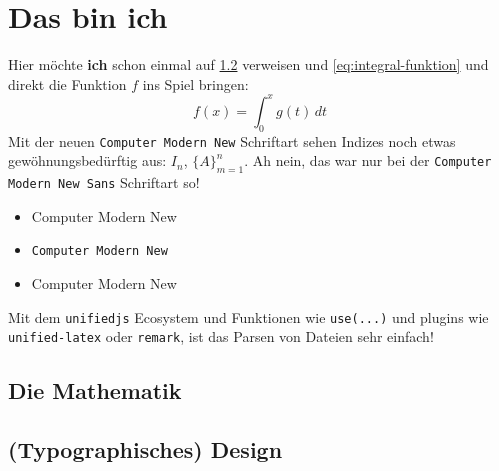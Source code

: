 \chapter{Das bin ich}

Hier möchte \textbf{ich} schon einmal auf \ref{sec:typographisches-design} verweisen und \eqref{eq:integral-funktion} und direkt die Funktion \(f\) ins Spiel bringen:
\begin{equation}\label{eq:integral-funktion}
    f(x) = \int_0^x g(t)\, dt
\end{equation}
Mit der neuen \texttt{Computer Modern New} Schriftart sehen Indizes noch etwas gewöhnungsbedürftig aus: \(I_n\), \(\{A\}_{m=1}^n\). Ah nein, das war nur bei der \texttt{Computer Modern New Sans} Schriftart so!

\begin{itemize}
    \item {\codefonttwo Computer Modern New}
    \item \texttt{Computer Modern New}
    \item {\codefont Computer Modern New}
\end{itemize}

Mit dem \texttt{unifiedjs} Ecosystem und Funktionen wie \texttt{use(...)} und plugins wie \texttt{unified-latex} oder \texttt{remark}, ist das Parsen von Dateien sehr einfach!

\section{Die Mathematik}\label{sec:die-mathematik}

\section{(Typographisches) Design} \label{sec:typographisches-design}
